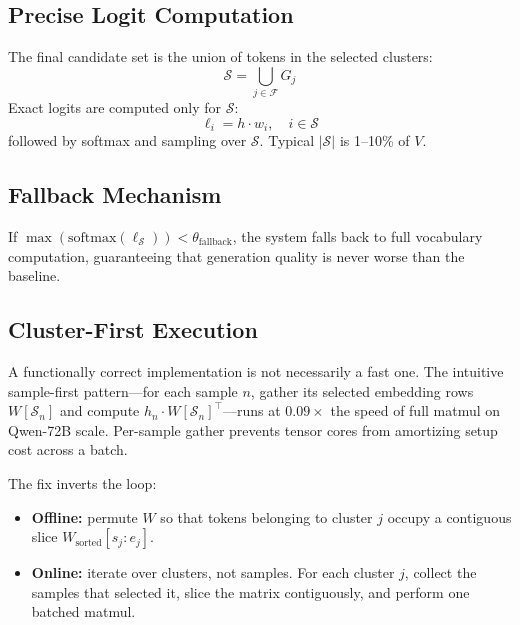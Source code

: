 \documentclass[11pt]{article}
\begin{document}
\subsection{Precise Logit Computation}\label{sec:precise}

The final candidate set is the union of tokens in the selected clusters:
\begin{equation}
\mathcal{S} = \bigcup_{j \in \mathcal{F}} G_j
\end{equation}
Exact logits are computed only for $\mathcal{S}$:
\begin{equation}
\ell_i = h \cdot w_i, \quad i \in \mathcal{S}
\end{equation}
followed by softmax and sampling over $\mathcal{S}$. Typical $|\mathcal{S}|$ is 1--10\% of $V$.

\subsection{Fallback Mechanism}

If $\max(\text{softmax}(\ell_{\mathcal{S}})) < \theta_{\text{fallback}}$, the system falls back to full vocabulary computation, guaranteeing that generation quality is never worse than the baseline.

\subsection{Cluster-First Execution}\label{sec:clusterfirst}

A functionally correct implementation is not necessarily a fast one. The intuitive sample-first pattern---for each sample $n$, gather its selected embedding rows $W[\mathcal{S}_n]$ and compute $h_n \cdot W[\mathcal{S}_n]^{\top}$---runs at $0.09\times$ the speed of full matmul on Qwen-72B scale. Per-sample gather prevents tensor cores from amortizing setup cost across a batch.

The fix inverts the loop:

\begin{itemize}
    \item \textbf{Offline:} permute $W$ so that tokens belonging to cluster $j$ occupy a contiguous slice $W_{\text{sorted}}[s_j : e_j]$.
    \item \textbf{Online:} iterate over clusters, not samples. For each cluster $j$, collect the samples that selected it, slice the matrix contiguously, and perform one batched matmul.
\end{itemize}
\end{document}

